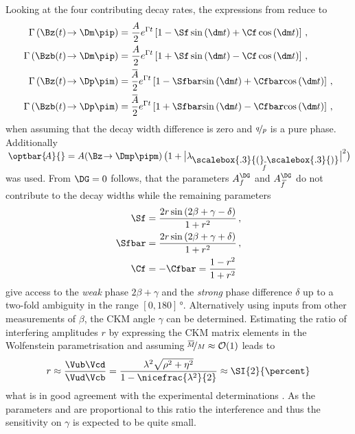 Looking at the four contributing decay rates, the expressions from  reduce to
\begin{align}
\Gamma\left(\Bz(t)\!\to\Dm\pip\right)&= \frac{A}{2}e^{\Gamma t}\left[1-\Sf\sin\left(\dm t\right)+\Cf\cos\left(\dm t\right)\right]\label{eq:DecRateB2Dmpip}\,,\\
\Gamma\left(\Bzb(t)\!\to\Dm\pip\right)&= \frac{A}{2}e^{\Gamma t}\left[1+\Sf\sin\left(\dm t\right)-\Cf\cos\left(\dm t\right)\right]\label{eq:DecRateBb2Dmpip}\,,\\
\Gamma\left(\Bz(t)\!\to\Dp\pim\right)&= \frac{\overline{\kern -1.0pt A\kern -1.0pt}}{2}e^{\Gamma t}\left[1-\Sfbar\!\sin\left(\dm t\right)+\Cfbar\!\cos\left(\dm t\right)\right]\label{eq:DecRateB2Dppim}\,,\\
\Gamma\left(\Bzb(t)\!\to\Dp\pim\right)&= \frac{\overline{\kern -1.0pt A\kern -1.0pt}}{2}e^{\Gamma t}\left[1+\Sfbar\!\sin\left(\dm t\right)-\Cfbar\!\cos\left(\dm t\right)\right]\label{eq:DecRateBb2Dppim}\,,
\end{align}
when assuming that the decay width difference \DG is zero and $\nicefrac{q}{p}$ is a pure phase.
Additionally $\kern 0.18em\optbar{\kern -0.18em A}{}=A\!\left(\Bz\!\to\Dmp\pipm\right)\big(1+\big|\lambda_{\kern -0.05em\shortstack{{\scalebox{.3}{(}\rule[.1ex]{0.25em}{.15mm}\scalebox{.3}{)}}\\ [-0.7ex]\kern -0.2em\scriptsize$f$}}\big|^2\big)$ was used.
From $\DG=0$ follows, that the parameters $A_f^{\DG}$ and $A_{\kern 1.5pt\overline{\kern -1.5pt f\kern 1.5pt}}^{\DG}$ do not contribute to the decay widths while the remaining \CP parameters
\begin{align}
\Sf&=\frac{2r\sin\left(2\beta+\gamma-\delta\right)}{1+r^2} \label{eq:DefSf}\,,\\
\Sfbar&=\frac{2r\sin\left(2\beta+\gamma+\delta\right)}{1+r^2} \label{eq:DefSfbar}\,,\\
\Cf&=-\Cfbar=\frac{1-r^2}{1+r^2}
\end{align}
give access to the \emph{weak} phase $2\beta+\gamma$ and the \emph{strong} phase difference $\delta$ up to a two-fold ambiguity in the range $[0, 180]\,\si{\degree}$.
Alternatively using inputs from other measurements of $\beta$, the CKM angle $\gamma$ can be determined.
Estimating the ratio of interfering amplitudes $r$ by expressing the CKM matrix elements in the Wolfenstein parametrisation and assuming $\nicefrac{\overline{\kern -1.0pt M\kern -1.0pt}}{M}\approx\mathcal{O}\!\left(1\right)$ leads to
\begin{equation}
r\approx\frac{\Vub\Vcd}{\Vud\Vcb}=\frac{\lambda^2\sqrt{\rho^2+\eta^2}}{1-\nicefrac{\lambda^2}{2}}\approx\SI{2}{\percent} \label{eq:ratioDpi}
\end{equation}
what is in good agreement with the experimental determinations \cite{Das:2010be, Aubert:2008zi}.
As the parameters \Sf and \Sfbar are proportional to this ratio the interference and thus the sensitivity on $\gamma$ is expected to be quite small.

